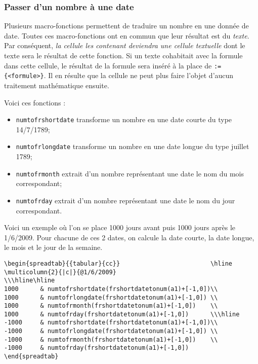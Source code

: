\documentclass[a4paper,10pt]{article}
\newcommand\verbinline[1][]{\lstinline[breaklines=false,basicstyle=\normalsize\ttfamily,#1]}
\begin{document}
\subsubsection{Passer d'un nombre à une date}
Plusieurs macro-fonctions permettent de traduire un nombre en une donnée de date. Toutes ces macro-fonctions ont en commun que leur résultat est du \emph{texte}. Par conséquent, \emph{la cellule les contenant deviendra une cellule textuelle} dont le texte sera le résultat de cette fonction. Si un texte cohabitait avec la formule dans cette cellule, le résultat de la formule sera inséré à la place de \verb-:={<formule>}-. Il en résulte que la cellule ne peut plus faire l'objet d'aucun traitement mathématique ensuite.

Voici ces fonctions :
\begin{itemize}
	\item \verbinline-numtofrshortdate- transforme un nombre en une date courte du type 14/7/1789;
	\item \verbinline-numtofrlongdate- transforme un nombre en une date longue du type  juillet 1789\fg;
	\item \verbinline-numtofrmonth- extrait d'un nombre représentant une date le nom du mois correspondant;
	\item \verbinline-numtofrday- extrait d'un nombre représentant une date le nom du jour correspondant.
\end{itemize}
Voici un  exemple où l'on se place 1000 jours avant puis 1000 jours après le 1/6/2009. Pour chacune de ces 2 dates, on calcule la date courte, la date longue, le mois et le jour de la semaine.\par\nobreak
\begin{lstlisting}
\begin{spreadtab}{{tabular}{cc}}                         \hline
\multicolumn{2}{|c|}{@1/6/2009}                          \\\hline\hline
1000      & numtofrshortdate(frshortdatetonum(a1)+[-1,0])\\
1000      & numtofrlongdate(frshortdatetonum(a1)+[-1,0]) \\
1000      & numtofrmonth(frshortdatetonum(a1)+[-1,0])    \\
1000      & numtofrday(frshortdatetonum(a1)+[-1,0])      \\\hline
-1000     & numtofrshortdate(frshortdatetonum(a1)+[-1,0])\\
-1000     & numtofrlongdate(frshortdatetonum(a1)+[-1,0]) \\
-1000     & numtofrmonth(frshortdatetonum(a1)+[-1,0])    \\
-1000     & numtofrday(frshortdatetonum(a1)+[-1,0])
\end{spreadtab}
\end{lstlisting}
\end{document}
